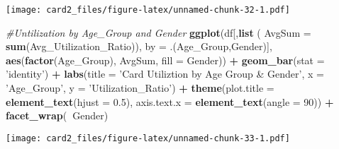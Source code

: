 \documentclass[]{article}
\newenvironment{Shaded}{\begin{snugshade}}{\end{snugshade}}
\newcommand{\CommentTok}[1]{\textcolor[rgb]{0.56,0.35,0.01}{\textit{#1}}}
\newcommand{\DataTypeTok}[1]{\textcolor[rgb]{0.13,0.29,0.53}{#1}}
\newcommand{\DecValTok}[1]{\textcolor[rgb]{0.00,0.00,0.81}{#1}}
\newcommand{\FloatTok}[1]{\textcolor[rgb]{0.00,0.00,0.81}{#1}}
\newcommand{\KeywordTok}[1]{\textcolor[rgb]{0.13,0.29,0.53}{\textbf{#1}}}
\newcommand{\NormalTok}[1]{#1}
\newcommand{\OperatorTok}[1]{\textcolor[rgb]{0.81,0.36,0.00}{\textbf{#1}}}
\newcommand{\StringTok}[1]{\textcolor[rgb]{0.31,0.60,0.02}{#1}}
\begin{document}
\texttt{[image: card2\_files/figure-latex/unnamed-chunk-32-1.pdf]}

\begin{Shaded}
\begin{Highlighting}[]
\CommentTok{#Untilization by Age_Group and Gender}
\KeywordTok{ggplot}\NormalTok{(df[,}\KeywordTok{list}\NormalTok{ ( }\DataTypeTok{AvgSum =} \KeywordTok{sum}\NormalTok{(Avg_Utilization_Ratio)), }\DataTypeTok{by =}\NormalTok{ .(Age_Group,Gender)], }\KeywordTok{aes}\NormalTok{(}\KeywordTok{factor}\NormalTok{(Age_Group), AvgSum, }\DataTypeTok{fill =}\NormalTok{ Gender)) }\OperatorTok{+}\StringTok{ }\KeywordTok{geom_bar}\NormalTok{(}\DataTypeTok{stat =} \StringTok{'identity'}\NormalTok{) }\OperatorTok{+}\StringTok{ }\KeywordTok{labs}\NormalTok{(}\DataTypeTok{title =} \StringTok{'Card Utiliztion by Age Group & Gender'}\NormalTok{, }\DataTypeTok{x =} \StringTok{'Age_Group'}\NormalTok{, }\DataTypeTok{y =} \StringTok{'Utilization_Ratio'}\NormalTok{) }\OperatorTok{+}\StringTok{ }\KeywordTok{theme}\NormalTok{(}\DataTypeTok{plot.title =} \KeywordTok{element_text}\NormalTok{(}\DataTypeTok{hjust =} \FloatTok{0.5}\NormalTok{), }\DataTypeTok{axis.text.x =} \KeywordTok{element_text}\NormalTok{(}\DataTypeTok{angle =} \DecValTok{90}\NormalTok{)) }\OperatorTok{+}\StringTok{ }\KeywordTok{facet_wrap}\NormalTok{(}\OperatorTok{~}\NormalTok{Gender) }
\end{Highlighting}
\end{Shaded}

\texttt{[image: card2\_files/figure-latex/unnamed-chunk-33-1.pdf]}
\end{document}

